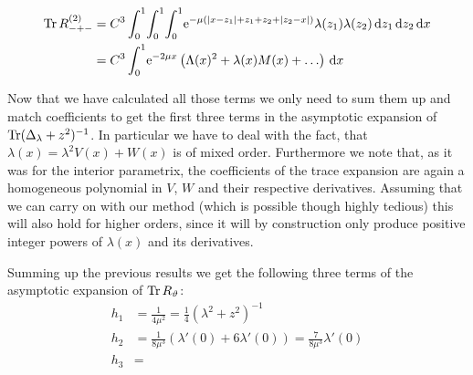 \begin{align*}
  \Tr R_{-+-}^{(2)} &= C^3 \Int{x}{
    \Int{z_2}{
      \Int{z_1}{
        \Eto{-\mu(\Abs{x-z_1}+z_1+z_2+\Abs{z_2-x})}\lambda(z_1)\lambda(z_2)
      }
    }
  } \\
  &= C^3 \Int{x}{
    \Eto{-2\mu x}
    \left(
      \Lambda(x)^2 + \lambda(x)M(x) + \ldots
    \right)
  }
\end{align*}

Now that we have calculated all those terms we only need to sum them up and
match coefficients to get the first three terms in the asymptotic expansion of
$\Tr(\Delta_\lambda + z^2)^{-1}$. In particular we have to deal with the fact,
that $\lambda(x) = \lambda^2 V(x) + W(x)$ is of mixed order. Furthermore we note
that, as it was for the interior parametrix, the coefficients of the trace
expansion are again a homogeneous polynomial in $V$, $W$ and their respective
derivatives. Assuming that we can carry on with our method (which is possible
though highly tedious) this will also hold for higher orders, since it will by
construction only produce positive integer powers of $\lambda(x)$ and its
derivatives.

Summing up the previous results we get the following three terms of the
asymptotic expansion of $\Tr R_\theta$:
\begin{align}
  h_1 &= \frac{1}{4\mu^2} = \frac{1}{4} (\lambda^2 + z^2)^{-1} \\
  h_2 &= \frac{1}{8\mu^3} (\lambda'(0) + 6\lambda'(0)) =
         \frac{7}{8\mu^3}\lambda'(0) \\
  h_3 &= 
\end{align}

